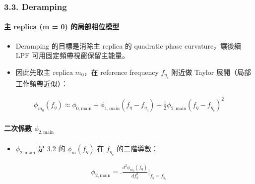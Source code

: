 \documentclass[10pt]{article}
\providecommand{\tightlist}{%
  \setlength{\itemsep}{0pt}\setlength{\parskip}{0pt}}
\begin{document}
\hypertarget{deramping}{%
\subsubsection{3.3. Deramping}\label{deramping}}

\hypertarget{ux4e3b-replica-m-0-ux7684ux5c40ux90e8ux76f8ux4f4dux6a21ux578b}{%
\paragraph{主 replica (m = 0)
的局部相位模型}\label{ux4e3b-replica-m-0-ux7684ux5c40ux90e8ux76f8ux4f4dux6a21ux578b}}

\begin{itemize}
\tightlist
\item
  Deramping 的目標是消除主 replica 的 quadratic phase curvature，讓後續
  LPF 可用固定頻帶視窗保留主能量。
\item
  因此先取主 replica \(m_0\)，在 reference frequency \(f_{\eta_c}\)
  附近做 Taylor 展開（局部工作頻帶近似）：
\end{itemize}

\begin{equation}
\begin{aligned}
\phi_{m_0}(f_\eta)\approx
\phi_{0,\mathrm{main}}+\phi_{1,\mathrm{main}}(f_\eta-f_{\eta_c})+\frac{1}{2}\phi_{2,\mathrm{main}}(f_\eta-f_{\eta_c})^2
\end{aligned}
\end{equation}

\hypertarget{ux4e8cux6b21ux4fc2ux6578-phi_2mathrmmain}{%
\paragraph{\texorpdfstring{二次係數
\(\phi_{2,\mathrm{main}}\)}{二次係數 \textbackslash phi\_\{2,\textbackslash mathrm\{main\}\}}}\label{ux4e8cux6b21ux4fc2ux6578-phi_2mathrmmain}}

\begin{itemize}
\tightlist
\item
  \(\phi_{2,\mathrm{main}}\) 是 3.2 的 \(\phi_m(f_\eta)\) 在
  \(f_{\eta_c}\) 的二階導數：
\end{itemize}

\begin{equation}
\begin{aligned}
\phi_{2,\mathrm{main}} = \biggl.\frac{d^2\phi_{m_0}(f_\eta)}{df_\eta^2}\biggr|_{f_\eta=f_{\eta_c}}
\end{aligned}
\end{equation}
\end{document}

